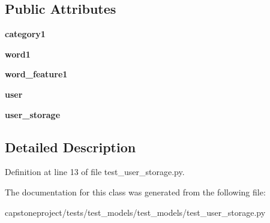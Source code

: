 \subsection*{Public Attributes}
\begin{DoxyCompactItemize}
\item 
\mbox{\label{classcapstoneproject_1_1tests_1_1test__models_1_1test__models_1_1test__user__storage_1_1_user_storage_test_class_a72b1d1e4430709e4dfa9b109476a9896}} 
{\bfseries category1}
\item 
\mbox{\label{classcapstoneproject_1_1tests_1_1test__models_1_1test__models_1_1test__user__storage_1_1_user_storage_test_class_a5dd9d852eb81bc50d54265e73dc8c09b}} 
{\bfseries word1}
\item 
\mbox{\label{classcapstoneproject_1_1tests_1_1test__models_1_1test__models_1_1test__user__storage_1_1_user_storage_test_class_ab79424b72dbabd81aa70f22f6b72f54f}} 
{\bfseries word\+\_\+feature1}
\item 
\mbox{\label{classcapstoneproject_1_1tests_1_1test__models_1_1test__models_1_1test__user__storage_1_1_user_storage_test_class_a37e5632d68da7869539d8932f2b16948}} 
{\bfseries user}
\item 
\mbox{\label{classcapstoneproject_1_1tests_1_1test__models_1_1test__models_1_1test__user__storage_1_1_user_storage_test_class_a4d519bdde48433c3d28bc62a94216922}} 
{\bfseries user\+\_\+storage}
\end{DoxyCompactItemize}


\subsection{Detailed Description}


Definition at line 13 of file test\+\_\+user\+\_\+storage.\+py.



The documentation for this class was generated from the following file\+:\begin{DoxyCompactItemize}
\item 
capstoneproject/tests/test\+\_\+models/test\+\_\+models/test\+\_\+user\+\_\+storage.\+py\end{DoxyCompactItemize}
